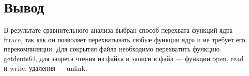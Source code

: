 




	






	



\section*{Вывод}

В результате сравнительного анализа выбран способ перехвата функций ядра --- ftrace, так как он позволяет перехватывать любые функции ядра и не требует его перекомпиляции.
Для сокрытия файла необходимо перехватить функцию getdents64, для запрета чтения из файла и записи в файл --- функции open, read и write, удаления --- unlink.